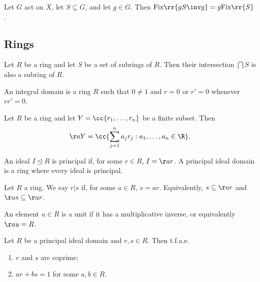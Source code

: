 \documentclass{article}
\begin{document}
\begin{lemma}
  Let $G$ act on $X$, let $S\subseteq G$, and let $g\in G$. Then
  $\text{Fix}\rr{gS\inv g}=g\text{Fix}\rr{S}$.
\end{lemma}

\subsection{Rings}\label{sec:rings}

\begin{lemma}
  Let $R$ be a ring and let $S$ be a set of subrings of $R$. Then their intersection
  $\bigcap S$ is also a subring of $R$.
\end{lemma}

\begin{definition}
  An integral domain is a ring $R$ such that $0\neq 1$ and $r=0$ or $r'=0$ whenever $rr'=0$.
\end{definition}

\begin{lemma}
  Let $R$ be a ring and let $Y=\cc{r_1,\ldots, r_n}$ be a finite subset. Then
  \begin{align*}
    \aa{Y}=\cc{\sum_{j=1}^{ n } a_jr_j : a_1,\ldots,a_n\in\R }.
  \end{align*}
\end{lemma}

\begin{definition}
  An ideal $I\trianglelefteq R$ is principal if, for some $r\in R$, $I=\aa{r}$.
  A principal ideal domain is a ring where every ideal is principal.
\end{definition}

\begin{definition}
  Let $R$ a ring. We say $r | s$ if, for some $a\in R$, $s=ar$. Equivalently, $s\subseteq\aa{r}$
  and $\aa{s}\subseteq\aa{r}$.

  An element $u\in R$ is a unit if it has a multiplicative inverse, or equivalently $\aa{u}=R$.
\end{definition}

\begin{proposition}
  Let $R$ be a principal ideal domain and $r,s\in R$. Then t.f.a.e.
  \begin{enumerate}
    \item $r$ and $s$ are coprime;
    \item $ar+bs = 1$ for some $a,b\in R$.
  \end{enumerate}
\end{proposition}
\end{document}
